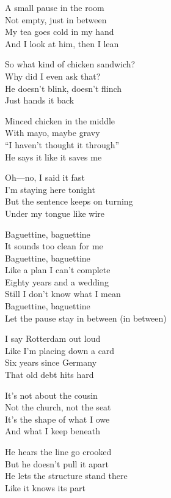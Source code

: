 \begin{lyrics}
A small pause in the room\\
Not empty, just in between\\
My tea goes cold in my hand\\
And I look at him, then I lean

So what kind of chicken sandwich?\\
Why did I even ask that?\\
He doesn’t blink, doesn’t flinch\\
Just hands it back

Minced chicken in the middle\\
With mayo, maybe gravy\\
“I haven’t thought it through”\\
He says it like it saves me

Oh—no, I said it fast\\
I’m staying here tonight\\
But the sentence keeps on turning\\
Under my tongue like wire

Baguettine, baguettine\\
It sounds too clean for me\\
Baguettine, baguettine\\
Like a plan I can’t complete\\
Eighty years and a wedding\\
Still I don’t know what I mean\\
Baguettine, baguettine\\
Let the pause stay in between (in between)

I say Rotterdam out loud\\
Like I’m placing down a card\\
Six years since Germany\\
That old debt hits hard

It’s not about the cousin\\
Not the church, not the seat\\
It’s the shape of what I owe\\
And what I keep beneath

He hears the line go crooked\\
But he doesn’t pull it apart\\
He lets the structure stand there\\
Like it knows its part


\end{lyrics}
